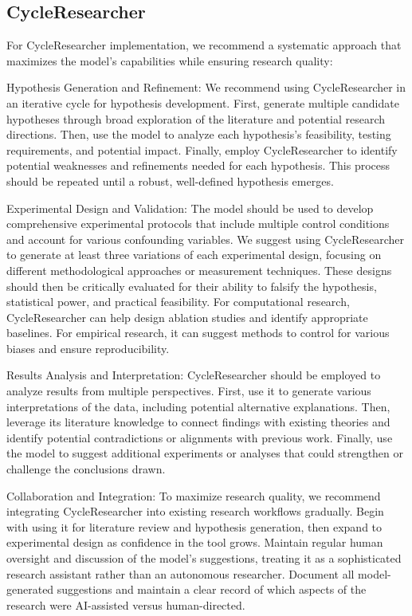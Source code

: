 \documentclass{article} %
\begin{document}
\subsection{CycleResearcher}
For CycleResearcher implementation, we recommend a systematic approach that maximizes the model's capabilities while ensuring research quality:

Hypothesis Generation and Refinement: We recommend using CycleResearcher in an iterative cycle for hypothesis development. First, generate multiple candidate hypotheses through broad exploration of the literature and potential research directions. Then, use the model to analyze each hypothesis's feasibility, testing requirements, and potential impact. Finally, employ CycleResearcher to identify potential weaknesses and refinements needed for each hypothesis. This process should be repeated until a robust, well-defined hypothesis emerges.

Experimental Design and Validation: The model should be used to develop comprehensive experimental protocols that include multiple control conditions and account for various confounding variables. We suggest using CycleResearcher to generate at least three variations of each experimental design, focusing on different methodological approaches or measurement techniques. These designs should then be critically evaluated for their ability to falsify the hypothesis, statistical power, and practical feasibility. For computational research, CycleResearcher can help design ablation studies and identify appropriate baselines. For empirical research, it can suggest methods to control for various biases and ensure reproducibility.

Results Analysis and Interpretation: CycleResearcher should be employed to analyze results from multiple perspectives. First, use it to generate various interpretations of the data, including potential alternative explanations. Then, leverage its literature knowledge to connect findings with existing theories and identify potential contradictions or alignments with previous work. Finally, use the model to suggest additional experiments or analyses that could strengthen or challenge the conclusions drawn.

Collaboration and Integration: To maximize research quality, we recommend integrating CycleResearcher into existing research workflows gradually. Begin with using it for literature review and hypothesis generation, then expand to experimental design as confidence in the tool grows. Maintain regular human oversight and discussion of the model's suggestions, treating it as a sophisticated research assistant rather than an autonomous researcher. Document all model-generated suggestions and maintain a clear record of which aspects of the research were AI-assisted versus human-directed.
\end{document}
